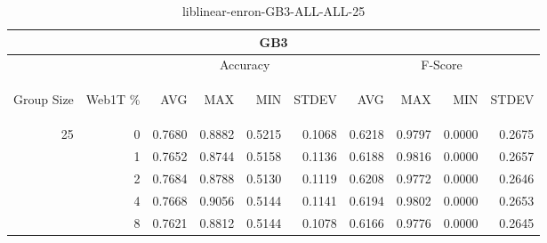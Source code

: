 \begin{center}
\begin{table}[htbp]
\begin{tabular}{ | r | r | r | r | r | r | r | r | r | r |}
\hline
\multicolumn{10}{|c|}{GB3}\\
\hline
 & & \multicolumn{4}{|c|}{Accuracy} & \multicolumn{4}{|c|}{F-Score}\\ \cline{3-10}
\begin{sideways}Group Size\end{sideways} & \begin{sideways}Web1T \%\end{sideways} & \begin{sideways}AVG\end{sideways} & \begin{sideways}MAX\end{sideways} & \begin{sideways}MIN\end{sideways} & \begin{sideways}STDEV\end{sideways} & \begin{sideways}AVG\end{sideways} & \begin{sideways}MAX\end{sideways} & \begin{sideways}MIN\end{sideways} & \begin{sideways}STDEV\end{sideways}\\
\hline
\multirow{5}{*}{25}
 & 0 & 0.7680 & 0.8882 & 0.5215 & 0.1068 & 0.6218 & 0.9797 & 0.0000 & 0.2675\\ \cline{2-10}
 & 1 & 0.7652 & 0.8744 & 0.5158 & 0.1136 & 0.6188 & 0.9816 & 0.0000 & 0.2657\\ \cline{2-10}
 & 2 & 0.7684 & 0.8788 & 0.5130 & 0.1119 & 0.6208 & 0.9772 & 0.0000 & 0.2646\\ \cline{2-10}
 & 4 & 0.7668 & 0.9056 & 0.5144 & 0.1141 & 0.6194 & 0.9802 & 0.0000 & 0.2653\\ \cline{2-10}
 & 8 & 0.7621 & 0.8812 & 0.5144 & 0.1078 & 0.6166 & 0.9776 & 0.0000 & 0.2645\\ \cline{2-10}
\hline
\end{tabular}
\caption{liblinear-enron-GB3-ALL-ALL-25}
\end{table}
\end{center}

